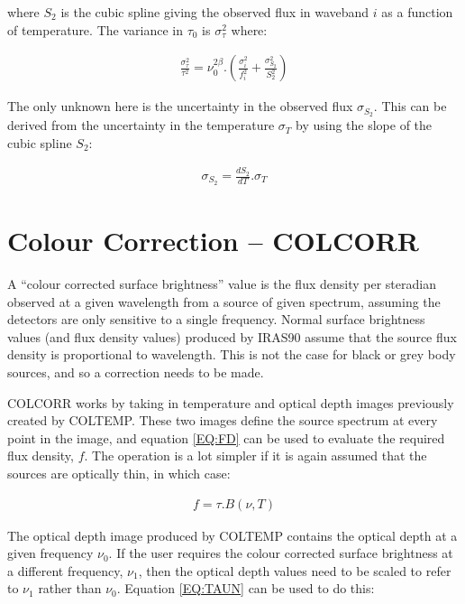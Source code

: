 where $S_{2}$ is the cubic spline giving the observed flux in waveband $i$ as a
function of temperature. The variance in $\tau_{0}$ is $\sigma^{2}_{\tau}$ 
where:

\begin{eqnarray*}
\frac{\sigma^{2}_{\tau}}{\tau^{2}} = \nu_{0}^{2\beta} .\left( 
\frac{\sigma^{2}_{i}}{f_{i}^{2}}  + \frac{\sigma^{2}_{S_{2}}}{S_{2}^{2}} 
\right)
\end{eqnarray*}

The only unknown here is the uncertainty in the observed flux $\sigma_{S_{2}}$. 
This can be derived from the uncertainty in the temperature $\sigma_{T}$ by 
using the slope of the cubic spline $S_{2}$:

\begin{eqnarray*}
\sigma_{S_{2}} = \frac{dS_{2}}{dT}.\sigma_{T}
\end{eqnarray*}

\section{ Colour Correction -- COLCORR}
A ``colour corrected surface brightness'' value is the flux density per
steradian observed at a given wavelength from a source of given spectrum,
assuming the detectors are only sensitive to a single frequency. Normal surface
brightness values (and flux density values) produced by {\small IRAS90} assume
that the source flux density is proportional to wavelength. This is not the case
for black or grey body sources, and so a correction needs to be made. 

{\small COLCORR} works by taking in temperature and optical depth images 
previously created by {\small COLTEMP}. These two images define the source 
spectrum at every point in the image, and equation \ref{EQ:FD} can be used to 
evaluate the required flux density, $f$. The operation is a lot simpler if it
is again assumed that the sources are optically thin, in which case:

\begin{eqnarray*}
f = \tau.B( \nu, T )
\end{eqnarray*}

The optical depth image produced by {\small COLTEMP} contains the optical depth
at a given frequency $\nu_{0}$. If the user requires the colour corrected
surface brightness at a different frequency, $\nu_{1}$, then the optical depth
values need to be scaled to refer to $\nu_{1}$ rather than $\nu_{0}$. Equation
\ref{EQ:TAUN} can be used to do this: 


